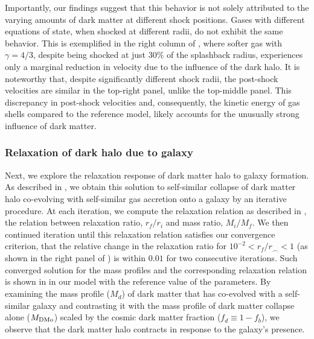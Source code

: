 Importantly, our findings suggest that this behavior is not solely attributed to the varying amounts of dark matter at different shock positions. Gases with different equations of state, when shocked at different radii, do not exhibit the same behavior. This is exemplified in the right column of , where softer gas with $\gamma=4/3$, despite being shocked at just $30\%$ of the splashback radius, experiences only a marginal reduction in velocity due to the influence of the dark halo. It is noteworthy that, despite significantly different shock radii, the post-shock velocities are similar in the top-right panel, unlike the top-middle panel. This discrepancy in post-shock velocities and, consequently, the kinetic energy of gas shells compared to the reference model, likely accounts for the unusually strong influence of dark matter.




\subsubsection{Relaxation of dark halo due to galaxy}
Next, we explore the relaxation response of dark matter halo to galaxy formation. As described in , we obtain this solution to self-similar collapse of dark matter halo co-evolving with self-similar gas accretion onto a galaxy by an iterative procedure. At each iteration, we compute the relaxation relation as described in , the relation between relaxation ratio, $r_f/r_i$ and mass ratio, $M_i/M_f$. We then continued iteration until this relaxation relation satisfies our convergence criterion, that the relative change in the relaxation ratio for $10^{-2}<r_f/r_{\smallfrown}<1$ (as shown in the right panel of ) is within $0.01$ for two consecutive iterations. Such converged solution for the mass profiles and the corresponding relaxation relation is shown in  in our model with the reference value of the parameters. By examining the mass profile ($M_d$) of dark matter that has co-evolved with a self-similar galaxy and contrasting it with the mass profile of dark matter collapse alone ($M_{\rm DMo}$) scaled by the cosmic dark matter fraction ($f_d \equiv 1-f_b$), we observe that the dark matter halo contracts in response to the galaxy's presence. 

